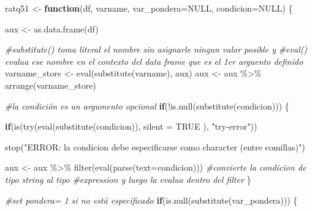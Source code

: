 \documentclass[
]{book}
\newenvironment{Shaded}{\begin{snugshade}}{\end{snugshade}}
\newcommand{\AttributeTok}[1]{\textcolor[rgb]{0.77,0.63,0.00}{#1}}
\newcommand{\CommentTok}[1]{\textcolor[rgb]{0.56,0.35,0.01}{\textit{#1}}}
\newcommand{\ConstantTok}[1]{\textcolor[rgb]{0.00,0.00,0.00}{#1}}
\newcommand{\ControlFlowTok}[1]{\textcolor[rgb]{0.13,0.29,0.53}{\textbf{#1}}}
\newcommand{\FunctionTok}[1]{\textcolor[rgb]{0.00,0.00,0.00}{#1}}
\newcommand{\NormalTok}[1]{#1}
\newcommand{\OtherTok}[1]{\textcolor[rgb]{0.56,0.35,0.01}{#1}}
\newcommand{\SpecialCharTok}[1]{\textcolor[rgb]{0.00,0.00,0.00}{#1}}
\newcommand{\StringTok}[1]{\textcolor[rgb]{0.31,0.60,0.02}{#1}}
\begin{document}
\begin{Shaded}
\begin{Highlighting}[numbers=left,,]
\NormalTok{ratq51 }\OtherTok{\textless{}{-}} \ControlFlowTok{function}\NormalTok{(df, varname, }\AttributeTok{var\_pondera=}\ConstantTok{NULL}\NormalTok{, }\AttributeTok{condicion=}\ConstantTok{NULL}\NormalTok{) \{}
    
    
\NormalTok{    aux }\OtherTok{\textless{}{-}} \FunctionTok{as.data.frame}\NormalTok{(df) }
    
    
    \CommentTok{\#substitute() toma literal el nombre sin asignarle ningun valor posible y }
    \CommentTok{\#eval() evalua ese nombre en el contexto del data frame que es el 1er arguento definido}
\NormalTok{    varname\_store }\OtherTok{\textless{}{-}} \FunctionTok{eval}\NormalTok{(}\FunctionTok{substitute}\NormalTok{(varname), aux) }
\NormalTok{    aux }\OtherTok{\textless{}{-}}\NormalTok{ aux }\SpecialCharTok{\%\textgreater{}\%} \FunctionTok{arrange}\NormalTok{(varname\_store)}
    
    
    
    \CommentTok{\#la condición es un argumento opcional}
    \ControlFlowTok{if}\NormalTok{(}\SpecialCharTok{!}\FunctionTok{is.null}\NormalTok{(}\FunctionTok{substitute}\NormalTok{(condicion))) \{}
      
       \ControlFlowTok{if}\NormalTok{(}\FunctionTok{is}\NormalTok{(}\FunctionTok{try}\NormalTok{(}\FunctionTok{eval}\NormalTok{(}\FunctionTok{substitute}\NormalTok{(condicion)), }\AttributeTok{silent =} \ConstantTok{TRUE}\NormalTok{ ), }\StringTok{"try{-}error"}\NormalTok{))}
        
          \FunctionTok{stop}\NormalTok{(}\StringTok{"ERROR: la condicion debe especificarse como character (entre comillas)"}\NormalTok{)}
      
\NormalTok{          aux }\OtherTok{\textless{}{-}}\NormalTok{ aux }\SpecialCharTok{\%\textgreater{}\%} \FunctionTok{filter}\NormalTok{(}\FunctionTok{eval}\NormalTok{(}\FunctionTok{parse}\NormalTok{(}\AttributeTok{text=}\NormalTok{condicion)))   }\CommentTok{\#convierte la condicion de tipo string al tipo }
                                                            \CommentTok{\#expression y luego la evalua dentro del filter}
\NormalTok{    \}}
    
    
    
    \CommentTok{\#set pondera= 1 si no está especificado}
    \ControlFlowTok{if}\NormalTok{(}\FunctionTok{is.null}\NormalTok{(}\FunctionTok{substitute}\NormalTok{(var\_pondera))) \{                           }
      

\end{Highlighting}
\end{Shaded}
\end{document}
